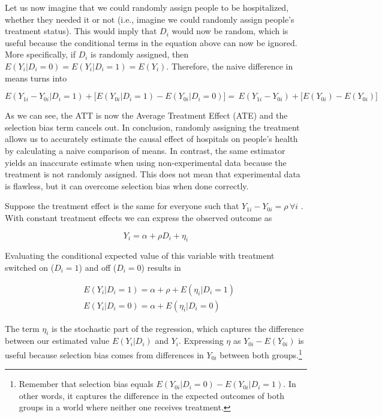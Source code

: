 \documentclass[12pt]{article}
\begin{document}
Let us now imagine that we could randomly assign people to be hospitalized,
whether they needed it or not (i.e., imagine we could randomly assign people's
treatment status). This would imply that $D_i$ would now be random, which is
useful because the conditional terms in the equation above can now be ignored.
More specifically, if $D_i$ is randomly assigned, then
$E(Y_i | D_i = 0) = E(Y_i | D_i = 1) = E(Y_i)$. Therefore, the naive difference
in means turns into

\begin{equation*}
    E(Y_{1i} - Y_{0i} | D_i = 1)
        + \big[ E(Y_{0i} | D_i = 1) - E(Y_{0i} | D_i = 0) \big]
        = \, E(Y_{1i} - Y_{0i}) + \big[ E(Y_{0i}) - E(Y_{0i}) \big]
\end{equation*}

As we can see, the ATT is now the Average Treatment Effect (ATE) and the
selection bias term cancels out. In conclusion, randomly assigning the
treatment allows us to accurately estimate the causal effect of hospitals on
people's health by calculating a naive comparison of means. In contrast, the
same estimator yields an inaccurate estimate when using non-experimental data
because the treatment is not randomly assigned. This does not mean that
experimental data is flawless, but it can overcome selection bias when done
correctly.

Suppose the treatment effect is the same for everyone such that
$Y_{1i} - Y_{0i} = \rho \, \forall i$ . With constant treatment effects we can
express the observed outcome as

\begin{equation*}
    Y_i = \alpha + \rho D_i + \eta_i
\end{equation*}

Evaluating the conditional expected value of this variable with treatment
switched on ($D_i = 1$) and off ($D_i = 0$) results in

\begin{align*}
    & E(Y_i | D_i = 1) = \alpha + \rho + E(\eta_i | D_i = 1) \\
    & E(Y_i | D_i = 0) = \alpha + E(\eta_i | D_i = 0)
\end{align*}

The term $\eta_i$ is the stochastic part of the regression, which captures the
difference between our estimated value $E(Y_i | D_i)$ and $Y_i$. Expressing
$\eta$ as $Y_{0i} - E(Y_{0i})$ is useful because selection bias comes from
differences in $Y_{0i}$ between both groups.\footnote{
    Remember that selection bias equals
    $E(Y_{0i} | D_i = 0) - E(Y_{0i} | D_i = 1)$. In other words, it captures
    the difference in the expected outcomes of both groups in a world where
    neither one receives treatment.
}
\end{document}
